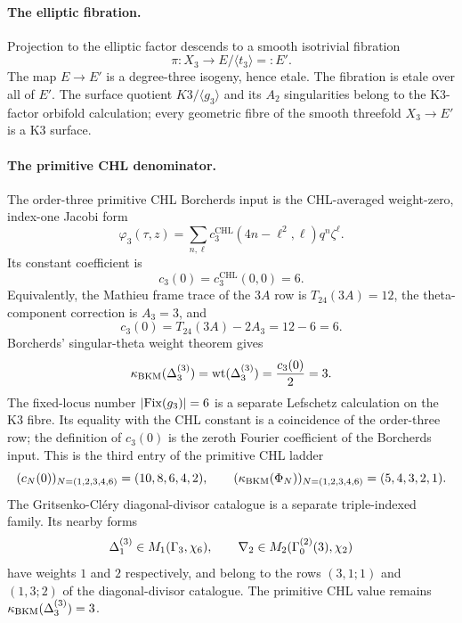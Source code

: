 \paragraph{The elliptic fibration.} Projection to the elliptic factor
descends to a smooth isotrivial fibration
\[
  \pi\colon X_3\longrightarrow E/\langle t_3\rangle=:E'.
\]
The map $E\to E'$ is a degree-three isogeny, hence etale. The fibration
is etale over all of $E'$. The surface quotient
$K3/\langle g_3\rangle$ and its $A_2$ singularities belong to the
K3-factor orbifold calculation; every
geometric fibre of the smooth threefold $X_3\to E'$ is a K3 surface.

\paragraph{The primitive CHL denominator.} The order-three primitive
CHL Borcherds input is the CHL-averaged weight-zero, index-one Jacobi
form
\[
  \varphi_3(\tau,z)=
  \sum_{n,\ell}c^{\mathrm{CHL}}_3(4n-\ell^2,\ell)q^n\zeta^\ell .
\]
Its constant coefficient is
\[
  c_3(0)=c^{\mathrm{CHL}}_3(0,0)=6.
\]
Equivalently, the Mathieu frame trace of the $3A$ row is
$T_{24}(3A)=12$, the theta-component correction is $A_3=3$, and
\[
  c_3(0)=T_{24}(3A)-2A_3=12-6=6.
\]
Borcherds' singular-theta weight theorem gives
\[
  \kappa_{\mathrm{BKM}}(\Delta_{3}^{(3)})
  =\mathrm{wt}(\Delta_{3}^{(3)})
  =\frac{c_3(0)}2
  =3.
\]
The fixed-locus number $|\mathrm{Fix}(g_3)|=6$ is a separate Lefschetz
calculation on the K3 fibre. Its equality with the CHL constant is a
coincidence of the order-three row; the definition of $c_3(0)$ is the
zeroth Fourier coefficient of the Borcherds input.
This is the third entry of the primitive CHL ladder
\[
  (c_N(0))_{N=(1,2,3,4,6)}=(10,8,6,4,2),\qquad
  (\kappa_{\mathrm{BKM}}(\Phi_N))_{N=(1,2,3,4,6)}=(5,4,3,2,1).
\]
The Gritsenko-Cl\'ery diagonal-divisor catalogue is a separate
triple-indexed family. Its nearby forms
\[
  \Delta_{1}^{(3)}\in M_1(\Gamma_3,\chi_6),\qquad
  \nabla_{2}\in M_2(\Gamma_0^{(2)}(3),\chi_2)
\]
have weights $1$ and $2$ respectively, and belong to the rows
$(3,1;1)$ and $(1,3;2)$ of the diagonal-divisor catalogue. The
primitive CHL value remains $\kappa_{\mathrm{BKM}}(\Delta_{3}^{(3)})=3$.

